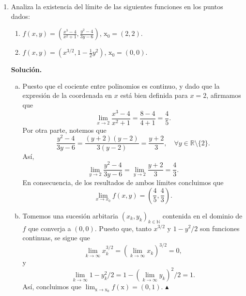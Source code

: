 \documentclass[12pt]{article}
\newcommand{\N}{\mathbb N}
\newcommand{\R}{\mathbb R}
\newcommand{\x}{\mathrm x}
\begin{document}
\begin{enumerate}
\begin{enumerate}[(a)]
\end{enumerate}



\newpage
\item Analiza la existencia del l\'imite de las siguientes funciones en los puntos dados:
\begin{enumerate}[(1)]
\item $\displaystyle{f(x,y) = \left( \frac{x^3-4}{x^2+1}, \frac{y^2-4}{3y-6} \right)}$, 
$\x_0=(2,2)$.
\item $\displaystyle{f(x,y) = \left( x^{3/2}, 1 - \frac{1}{2}y^2 \right)}$, $\x_0=(0,0)$.
\end{enumerate} 
\textbf{Solución.}
\begin{enumerate}[(a)]
    \item Puesto que el cociente entre polinomios es continuo, y dado que la expresión de la coordenada en $x$ está bien definida para $x=2$, afirmamos que
    \[
    \lim_{x\to 2}\frac{x^3-4}{x^2+1} = \frac{8-4}{4+1} = \frac{4}{5}. 
    \]
    Por otra parte, notemos que
    \[
    \frac{y^2-4}{3y-6} = \frac{(y+2)(y-2)}{3(y-2)} = \frac{y+2}{3}, \quad \forall y \in \R\setminus\{2\}.
    \]
    Así,
    \[
    \lim_{y\to 2}\frac{y^2-4}{3y-6} = \lim_{y\to 2}\frac{y+2}{3} = \frac{4}{3}.
    \]
    En consecuencia, de los resultados de ambos límites concluimos que
    \[
    \lim_{x\to x_0}f(x,y) = \left(\frac{4}{5},\frac{4}{3}\right).
    \]
    \item Tomemos una sucesión arbitaria $(x_k,y_k)_{k\in \N}$ contenida en el dominio de $f$ que converja a $(0,0)$. Puesto que, tanto $x^{3/2}$ y $1-y^2/2$ son funciones continuas,
    se sigue que
    \[
    \lim_{k\to \infty}x_k^{3/2}=\left(\lim_{k\to \infty}x_k\right)^{3/2} = 0,
    \]
    y
    \[
    \lim_{k\to \infty}1-y_k^2/2 = 1-\left(\lim_{k\to \infty}y_k\right)^2/2 = 1.
    \]
    Así, concluimos que $\lim_{\x\to \x_0}f(\x)=(0,1)$.
    \hfill $\blacktriangle$
    
\end{enumerate}


\end{enumerate}
\end{document}
